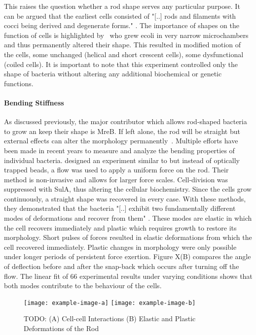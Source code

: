 \documentclass{article}
\begin{document}
This raises the question whether a rod shape serves any particular purpose.
It can be argued that the earliest cells consisted of "[..] rods and filaments with cocci being
derived and degenerate forms." \cite{Young2006}.
The importance of shapes on the function of cells is highlighted by~\cite{Takeuchi2005} who grew
\ac{ecoli} in very narrow microchambers and thus permanently altered their shape.
This resulted in modified motion of the cells, some unchanged (helical and short crescent cells),
some dysfunctional (coiled cells).
It is important to note that this experiment controlled only the shape of bacteria without altering
any additional biochemical or genetic functions.

\paragraph{Bending Stiffness}

As discussed previously, the major contributor which allows rod-shaped bacteria to grow an keep
their shape is MreB.
If left alone, the rod will be straight but external effects can alter the morphology
permanently~\cite{Takeuchi2005}.
Multiple efforts have been made in recent years to measure and analyze the bending properties of
individual bacteria.
\cite{Amir2014_2} designed an experiment similar to \cite{Wang2010} but instead of optically trapped
beads, a flow was used to apply a uniform force on the rod.
Their method is non-invasive and allows for larger force scales.
Cell-division was suppressed with SulA, thus altering the cellular biochemistry.
Since the cells grow continuously, a straight shape was recovered in every case.
With these methods, they demonstrated that the bacteria "[..] exhibit two fundamentally different
modes of deformations and recover from them" \cite{Amir2014_2}.
These modes are elastic in which the cell recovers immediately and plastic which requires growth to
restore its morphology.
Short pulses of forces resulted in elastic deformations from which the cell recovered immediately.
Plastic changes in morphology were only possible under longer periods of persistent force exertion.
Figure X(B) compares the angle of deflection before and after the snap-back
which occurs after turning off the flow.
The linear fit of 66 experimental results under varying conditions shows that both modes contribute
to the behaviour of the cells.

\begin{figure}[H]
    \centering
    \texttt{[image: example-image-a]}
    \texttt{[image: example-image-b]}
    \caption{TODO:
        (A) Cell-cell Interactions
        (B) Elastic and Plastic Deformations of the Rod
    }
\end{figure}
\end{document}
